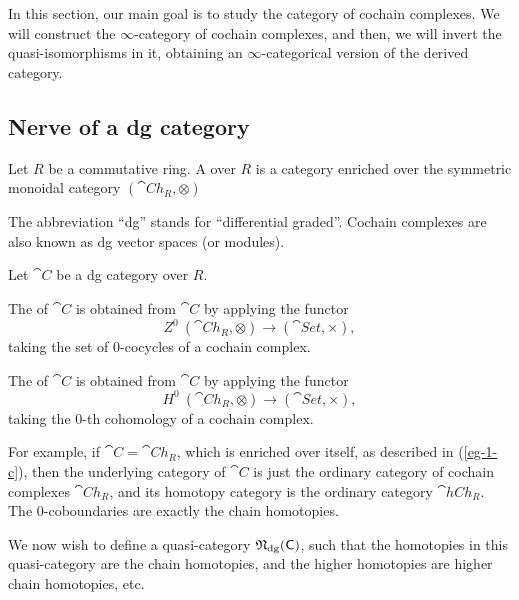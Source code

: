 In this section, our main goal is to study the category of cochain complexes.
We will construct the $\infty$-category of cochain complexes, and then, 
we will invert the quasi-isomorphisms in it, obtaining an $\infty$-categorical
version of the derived category.

\subsection{Nerve of a dg category}

\begin{definition}
    Let $R$ be a commutative ring.
    A  over $R$ is a category enriched over the
    symmetric monoidal category $(\cat{Ch}_R,\otimes)$
\end{definition}

The abbreviation ``dg'' stands for ``differential graded''.
Cochain complexes are also known as dg vector spaces (or modules).

\begin{definition}
    Let $\cat{C}$ be a dg category over $R$.
    \begin{itms}
        \item The  of $\cat{C}$
        is obtained from $\cat{C}$ by applying the functor 
        \[Z^0\:(\cat{Ch}_R,\otimes)\to(\cat{Set},\times),\]
        taking the set of $0$-cocycles of a cochain complex.
        \item The  of $\cat{C}$
        is obtained from $\cat{C}$ by applying the functor 
        \[H^0\:(\cat{Ch}_R,\otimes)\to(\cat{Set},\times),\]
        taking the $0$-th cohomology of a cochain complex.
    \end{itms}
\end{definition}

For example, if $\cat{C}=\cat{Ch}_R$,
which is enriched over itself, as described in (\ref{eg-1-c}),
then the underlying category of $\cat{C}$ is just the ordinary
category of cochain complexes $\cat{Ch}_R$,
and its homotopy category is the ordinary category $\cat{hCh}_R$.
The $0$-coboundaries are exactly the chain homotopies.

We now wish to define a quasi-category $\mathfrak{N}_{\mathrm{dg}}(\mathsf{C})$,
such that the homotopies in this quasi-category are the chain homotopies,
and the higher homotopies are higher chain homotopies, etc.

